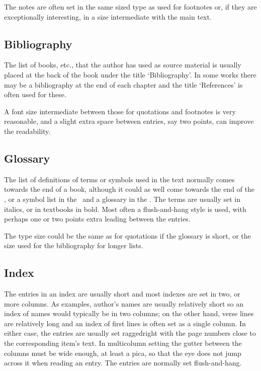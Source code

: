 \documentclass[10pt,letterpaper,extrafontsizes]{memoir}
\begin{document}
    The notes are often set in the same sized type as used for footnotes or,
if they are exceptionally interesting, in a size intermediate with the main 
text.

\subsection{Bibliography}

   The list of books, etc., that the author has used as source material is
usually placed at the back of the book under the title `Bibliography'. In
some works there may be a bibliography at the end of 
each chapter and the title `References' is often used for these.

    A font size intermediate between those for quotations and footnotes is
very reasonable, and a slight extra space between entries, say two points,
can improve the readability.

\subsection{Glossary}

   The list of definitions of terms or symbols used in the text normally
comes towards the end of a book, although it could as well come towards
the end of the \pixfrontmatter, or a symbol list 
in the \pixfrontmatter\ and a glossary
in the \pixbackmatter. The terms are usually set in italics, or in textbooks 
in bold. Most often a flush-and-hang style is used, with
perhaps one or two points extra leading between the entries.

    The type size could be the same as for quotations if the glossary is short,
or the size used for the bibliography for longer lists.

\subsection{Index}

    The entries in an index are usually short and most indexes
are set in two, or more columns. As examples, author's names are usually 
relatively short so an index of names would typically be in two columns;
on the other hand, verse lines are relatively long and an index of first lines
is often set as a single column. In either case, the entries are usually set 
raggedright with the page numbers close to the corresponding item's text.
In multicolumn setting the gutter between the columns must be wide enough,
at least a pica, so
that the eye does not jump across it when reading an entry. The entries are
normally set flush-and-hang.
\end{document}
